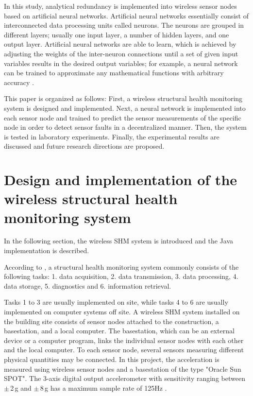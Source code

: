 \documentclass[12pt,a4paper]{scrartcl}
\begin{document}
	In this study, analytical redundancy is implemented into wireless sensor nodes based on artificial neural networks.
	Artificial neural networks essentially consist of interconnected data processing units called neurons. 
	The neurons are grouped in different layers; usually one input layer, a number of hidden layers, and one output layer.
	Artificial neural networks are able to learn, which is achieved by adjusting the weights of the inter-neuron connections until a set of given input variables results in the desired output variables; for example, a neural network can be trained to approximate any mathematical functions with arbitrary accuracy \citep{Li2011}.
	
	This paper is organized as follows:
	First, a wireless structural health monitoring system is designed and implemented. 
	Next, a neural network is implemented into each sensor node and trained to predict the sensor measurements of the specific node in order to detect sensor faults in a decentralized manner. 
	Then, the system is tested in laboratory experiments. 
	Finally, the experimental results are discussed and future research directions are proposed.
	
	
	\newpage
	
	\section*{Design and implementation of the wireless structural health monitoring system}
	In the following section, the wireless SHM system is introduced and the Java implementation is described.
	
	According to \citet{BisbySHM}, a structural health monitoring system commonly consists of the following tasks:
	1. data acquisition,
	2. data transmission, 
	3. data processing,
	4. data storage,
	5. diagnostics and 
	6. information retrieval.
	
	Tasks 1 to 3 are usually implemented on site, while tasks 4 to 6 are usually implemented on computer systems off site.
	A wireless SHM system installed on the building site consists of sensor nodes attached to the construction, a basestation, and a local computer. 
	The basestation, which can be an external device or a computer program, links the individual sensor nodes with each other and the local computer.
	To each sensor node, several sensors measuring different physical quantities may be connected. 
	In this project, the acceleration is measured using wireless sensor nodes and a basestation of the type "Oracle Sun SPOT". 
	The 3-axis digital output accelerometer with sensitivity ranging between $\pm$\,2\,g and $\pm$\,8\,g has a maximum sample rate of 125Hz \citep{eDemo2010}.
	
\end{document}
